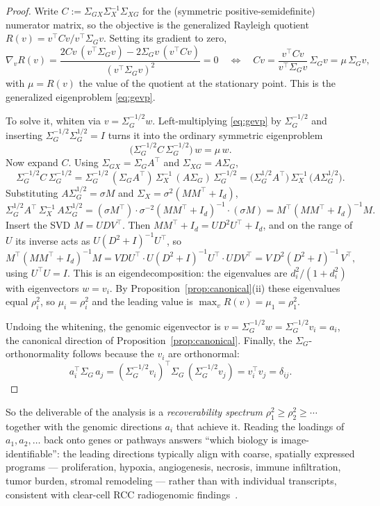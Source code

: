 \documentclass{article}
\newcommand{\Sg}{\Sigma_{G}}
\newcommand{\Sx}{\Sigma_{X}}
\newcommand{\Sgx}{\Sigma_{GX}}
\newcommand{\Sxg}{\Sigma_{XG}}
\newcommand{\T}{^{\top}}
\begin{document}
\begin{proof}
Write $C := \Sgx \Sx^{-1} \Sxg$ for the (symmetric positive-semidefinite)
numerator matrix, so the objective is the generalized Rayleigh quotient
$R(v) = v\T C v / v\T \Sg v$. Setting its gradient to zero,
\[
\nabla_v R(v)
= \frac{2 C v\,(v\T\Sg v) - 2\Sg v\,(v\T C v)}{(v\T\Sg v)^2} = 0
\quad\Longleftrightarrow\quad
C v = \frac{v\T C v}{v\T \Sg v}\,\Sg v = \mu\,\Sg v,
\]
with $\mu = R(v)$ the value of the quotient at the stationary point. This is the
generalized eigenproblem \eqref{eq:gevp}.

To solve it, whiten via $v = \Sg^{-1/2} w$. Left-multiplying \eqref{eq:gevp} by
$\Sg^{-1/2}$ and inserting $\Sg^{-1/2}\Sg^{1/2} = I$ turns it into the ordinary
symmetric eigenproblem
\[
\big(\Sg^{-1/2} C\, \Sg^{-1/2}\big)\, w = \mu\, w .
\]
Now expand $C$. Using $\Sgx = \Sg A\T$ and $\Sxg = A\Sg$,
\[
\Sg^{-1/2} C\, \Sg^{-1/2}
= \Sg^{-1/2}\,(\Sg A\T)\,\Sx^{-1}\,(A\Sg)\,\Sg^{-1/2}
= \big(\Sg^{1/2} A\T\big)\,\Sx^{-1}\,\big(A\Sg^{1/2}\big).
\]
Substituting $A\Sg^{1/2} = \sigma M$ and $\Sx = \sigma^2(MM\T + I_d)$,
\[
\Sg^{1/2} A\T\, \Sx^{-1}\, A\Sg^{1/2}
= (\sigma M\T)\cdot \sigma^{-2}(MM\T + I_d)^{-1} \cdot (\sigma M)
= M\T (MM\T + I_d)^{-1} M .
\]
Insert the SVD $M = U D V\T$. Then $MM\T + I_d = U D^2 U\T + I_d$, and on the
range of $U$ its inverse acts as $U(D^2+I)^{-1}U\T$, so
\[
M\T(MM\T + I_d)^{-1} M
= V D U\T \cdot U (D^2 + I)^{-1} U\T \cdot U D V\T
= V\, D^2 (D^2 + I)^{-1}\, V\T,
\]
using $U\T U = I$. This is an eigendecomposition: the eigenvalues are
$d_i^2/(1+d_i^2)$ with eigenvectors $w = v_i$. By Proposition~\ref{prop:canonical}(ii)
these eigenvalues equal $\rho_i^2$, so $\mu_i = \rho_i^2$ and the leading value is
$\max_v R(v) = \mu_1 = \rho_1^2$.

Undoing the whitening, the genomic eigenvector is $v = \Sg^{-1/2} w = \Sg^{-1/2} v_i = a_i$,
the canonical direction of Proposition~\ref{prop:canonical}. Finally, the
$\Sg$-orthonormality follows because the $v_i$ are orthonormal:
\[
a_i\T \Sg\, a_j
= (\Sg^{-1/2} v_i)\T \Sg\, (\Sg^{-1/2} v_j)
= v_i\T v_j = \delta_{ij}.
\]
\end{proof}

So the deliverable of the analysis is a \emph{recoverability spectrum}
$\rho_1^2 \ge \rho_2^2 \ge \cdots$ together with the genomic directions $a_i$
that achieve it. Reading the loadings of $a_1, a_2, \dots$ back onto genes or
pathways answers ``which biology is image-identifiable'': the leading directions
typically align with coarse, spatially expressed programs --- proliferation,
hypoxia, angiogenesis, necrosis, immune infiltration, tumor burden, stromal
remodeling --- rather than with individual transcripts, consistent with
clear-cell RCC radiogenomic
findings~\citep{karlo2014ccrcc,shinagare2015ccrcc,shao2025hypoxia}.
\end{document}
